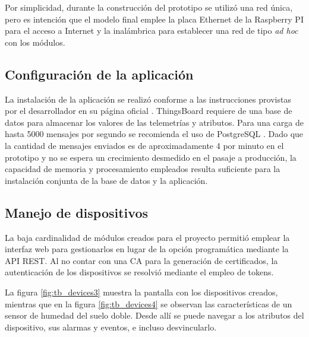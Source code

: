 Por simplicidad, durante la construcción del prototipo se utilizó una red única, pero es intención que el modelo final emplee la placa Ethernet de la Raspberry PI para el acceso a Internet y la inalámbrica para establecer una red de tipo \textit{ad hoc} con los módulos.


\subsection{Configuración de la aplicación}
\label{sec:Configuración de la aplicación}

La instalación de la aplicación se realizó conforme a las instrucciones provistas por el desarrollador en su página oficial \citep{tb_install}.
ThingsBoard requiere de una base de datos para almacenar los valores de las telemetrías y atributos. Para una carga de hasta 5000 mensajes por segundo se recomienda el uso de PostgreSQL \citep{postgresql}. Dado que la cantidad de mensajes enviados es de aproximadamente 4 por minuto en el prototipo y no se espera un crecimiento desmedido en el pasaje a producción, la capacidad de memoria y procesamiento empleados resulta suficiente para la instalación conjunta de la base de datos y la aplicación.

\subsection{Manejo de dispositivos}
\label{sec:Manejo de dispositivos}

La baja cardinalidad de módulos creados para el proyecto permitió emplear la interfaz web para gestionarlos en lugar de la opción programática mediante la API REST.
Al no contar con una CA para la generación de certificados, la autenticación de los dispositivos se resolvió mediante el empleo de tokens.

La figura \ref{fig:tb_devices3} muestra la pantalla con los dispositivos creados, mientras que en la figura \ref{fig:tb_devices4} se observan las características de un sensor de humedad del suelo doble. Desde allí se puede navegar a los atributos del dispositivo, sus alarmas y eventos, e incluso desvincularlo.







